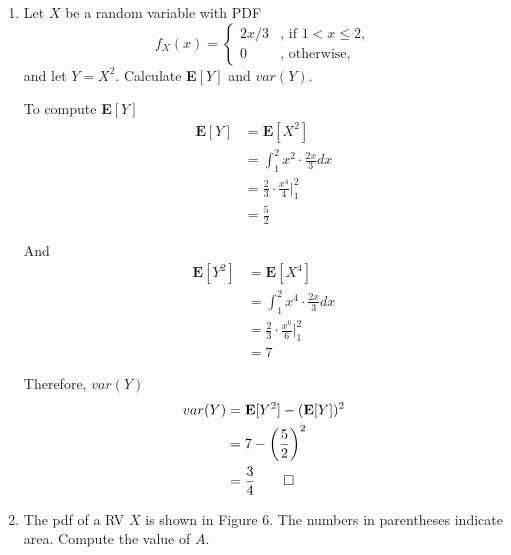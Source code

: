 \documentclass[paper=usletter, fontsize=12pt]{article}
\begin{document}
\begin{enumerate}
\begin{cproof}
        \end{cproof}

        \item Let $X$ be a random variable with PDF
        \begin{equation*}
            f_X(x) = \begin{cases}
                2x/3 & \text{, if } 1 < x \le 2,\\
                0 & \text{, otherwise, }
            \end{cases}
        \end{equation*}
        and let $Y=X^2$. Calculate \textbf{E}$[Y]$ and $var(Y)$.
        \begin{cproof}

            To compute \textbf{E}$[Y]$
            \begin{align*}
                \textbf{E}[Y] & = \textbf{E}[X^2] \\
                & = \int_{1}^{2}x^2\cdot\frac{2x}{3}dx \\
                & = \frac{2}{3}\cdot\frac{x^4}{4}\bigg\vert_1^2\\
                & = \frac{5}{2}
            \end{align*}
            \endgroup

            And
            \begin{align*}
                \textbf{E}[Y^2] & = \textbf{E}[X^4] \\
                & = \int_{1}^{2}x^4\cdot\frac{2x}{3}dx \\
                & = \frac{2}{3}\cdot\frac{x^6}{6}\bigg\vert_1^2\\
                & = 7
            \end{align*}
            \endgroup

            Therefore, $var(Y)$
            \begin{align*}
                var(Y) & = \textbf{E}[Y^2] - (\textbf{E}[Y])^2 \\
                & = 7 - \bigg(\frac{5}{2}\bigg)^2 \\
                & = \frac{3}{4} \qedhere
            \end{align*}
            \endgroup

        \end{cproof}

        \item The pdf of a RV $X$ is shown in Figure 6. The numbers in
        parentheses indicate area. Compute the value of $A$.
        \begin{cproof}


\end{cproof}
\end{enumerate}
\end{document}
